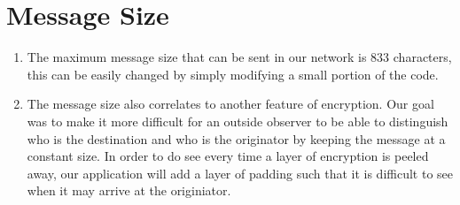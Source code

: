 \documentclass[10pt]{report}
\begin{document}
\section{Message Size}
    \begin{enumerate}
        \item The maximum message size that can be sent in our network is 833 characters, this can be easily changed by simply modifying a small portion of the code.
        \item The message size also correlates to another feature of encryption. Our goal was to make it more difficult for an outside observer to be able to distinguish who is the destination and who is the originator by keeping the message at a constant size. In order to do see every time a layer of encryption is peeled away, our application will add a layer of padding such that it is difficult to see when it may arrive at the originiator.
    \end{enumerate}
\end{document}
